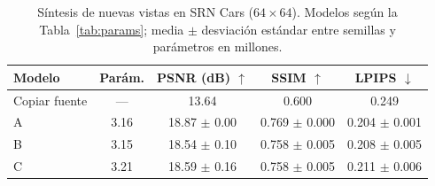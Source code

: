 \begin{table}[t]
\centering
\caption{Síntesis de nuevas vistas en SRN Cars ($64\times64$). Modelos según la Tabla~\ref{tab:params}; media $\pm$ desviación estándar entre semillas y parámetros en millones.}
\label{tab:principal}
\setlength{\tabcolsep}{2pt}
\begin{tabular}{lcccc}
\toprule
Modelo & Parám. & PSNR (dB) $\uparrow$ & SSIM $\uparrow$ & LPIPS $\downarrow$ \\
\midrule
Copiar fuente & — & 13.64 & 0.600 & 0.249 \\
A & 3.16 & 18.87 $\pm$ 0.00 & 0.769 $\pm$ 0.000 & 0.204 $\pm$ 0.001 \\
B & 3.15 & 18.54 $\pm$ 0.10 & 0.758 $\pm$ 0.005 & 0.208 $\pm$ 0.005 \\
C & 3.21 & 18.59 $\pm$ 0.16 & 0.758 $\pm$ 0.005 & 0.211 $\pm$ 0.006 \\
\bottomrule
\end{tabular}
\end{table}

